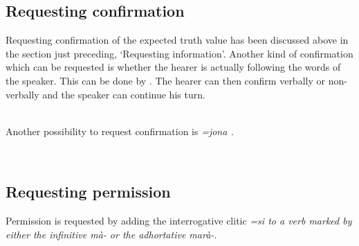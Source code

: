 \subsection{Requesting confirmation}\label{sec:pragm:Requestingconfirmation}
Requesting confirmation of the expected truth value has been discussed above in the section just preceding, `Requesting information'. Another kind of confirmation which can be requested is whether the hearer is actually following the words of the speaker. This can be done by . The hearer can then confirm verbally or non-verbally and the speaker can continue his turn.

 \\
Another possibility to request confirmation is \em =jona \em {}.


\\ 


\subsection{Requesting permission}\label{sec:pragm:Requestingpermission}
Permission is requested by adding the interrogative clitic \em =si \em to a verb marked by either the infinitive \em mà- \em or the adhortative \em marà-\em.


 \\

 \\
 

